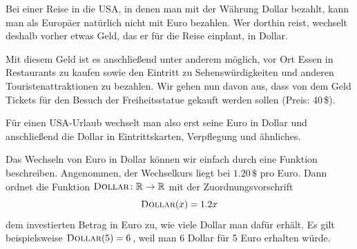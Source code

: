 \documentclass[../../main.tex]{subfiles}
\begin{document}
\begin{example}{}
    
    Bei einer Reise in die USA, in denen man mit der Währung Dollar bezahlt, kann man als Europäer natürlich nicht mit Euro bezahlen. Wer dorthin reist, wechselt deshalb vorher etwas Geld, das er für die Reise einplant, in Dollar.
 
    Mit diesem Geld ist es anschließend unter anderem möglich, vor Ort Essen in Restaurants zu kaufen sowie den Eintritt zu Sehenswürdigkeiten und anderen Touristenattraktionen zu bezahlen. Wir gehen nun davon aus, dass von dem Geld Tickets für den Besuch der Freiheitsstatue gekauft werden sollen (Preis: 40\,\$).

    Für einen USA-Urlaub wechselt man also erst seine Euro in Dollar und anschließend die Dollar in Eintrittskarten, Verpflegung und ähnliches. 
    
    \begin{center}
    \end{center}

    Das Wechseln von Euro in Dollar können wir einfach durch eine Funktion beschreiben. Angenommen, der Wechselkurs liegt bei $1.20\,\$$ pro Euro. Dann ordnet die Funktion $\textsc{Dollar}\colon\mathbb{R}\rightarrow\mathbb{R}$ mit der Zuordnungsvorschrift 
    \[\textsc{Dollar}(x)=1.2x\] 
    dem investierten Betrag in Euro zu, wie viele Dollar man dafür erhält. Es gilt beispielsweise $\textsc{Dollar}(5)=6$, weil man 6 Dollar für 5 Euro erhalten würde.
    

\end{example}
\end{document}
